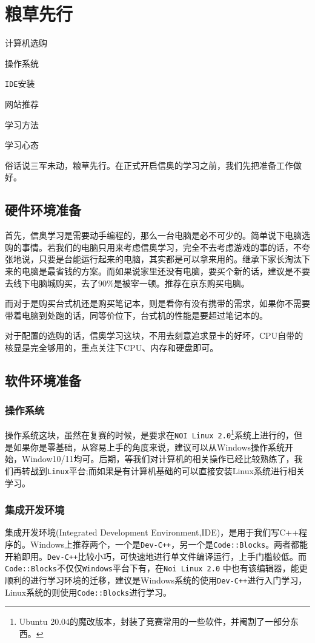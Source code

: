 \chapter{粮草先行}
\begin{introduction}
	\item 计算机选购
	\item 操作系统
	\item \texttt{IDE}安装
	\item 网站推荐
	\item 学习方法
	\item 学习心态
\end{introduction}

俗话说三军未动，粮草先行。在正式开启信奥的学习之前，我们先把准备工作做好。
\section{硬件环境准备}
首先，信奥学习是需要动手编程的，那么一台电脑是必不可少的。简单说下电脑选购的事情。若我们的电脑只用来考虑信奥学习，完全不去考虑游戏的事的话，不夸张地说，只要是台能运行起来的电脑，其实都是可以拿来用的。继承下家长淘汰下来的电脑是最省钱的方案。而如果说家里还没有电脑，要买个新的话，建议是不要去线下电脑城购买，去了$ 90\% $是被宰一顿。推荐在京东购买电脑。

而对于是购买台式机还是购买笔记本，则是看你有没有携带的需求，如果你不需要带着电脑到处跑的话，同等价位下，台式机的性能是要超过笔记本的。

对于配置的选购的话，信奥学习这块，不用去刻意追求显卡的好坏，CPU自带的核显是完全够用的，重点关注下CPU、内存和硬盘即可。
\section{软件环境准备}
\subsection{操作系统}
操作系统这块，虽然在复赛的时候，是要求在\texttt{NOI Linux 2.0}\footnote{Ubuntu 20.04的魔改版本，封装了竞赛常用的一些软件，并阉割了一部分东西。}系统上进行的，但是如果你是零基础，从容易上手的角度来说，建议可以从Windows操作系统开始，Window10/11均可。后期，等我们对计算机的相关操作已经比较熟练了，我们再转战到\texttt{Linux}平台;而如果是有计算机基础的可以直接安装Linux系统进行相关学习。
\subsection{集成开发环境}
集成开发环境(Integrated Development Environment,IDE)，是用于我们写C++程序的。Windows上推荐两个，一个是\texttt{Dev-C++}，另一个是\texttt{Code::Blocks}。两者都能开箱即用。\texttt{Dev-C++}比较小巧，可快速地进行单文件编译运行，上手门槛较低。而\texttt{Code::Blocks}不仅仅\texttt{Windows}平台下有，在\texttt{Noi Linux 2.0} 中也有该编辑器，能更顺利的进行学习环境的迁移，建议是Windows系统的使用\texttt{Dev-C++}进行入门学习，Linux系统的则使用\texttt{Code::Blocks}进行学习。

